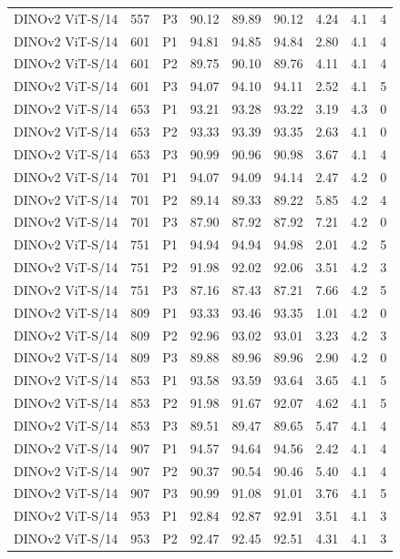 {\begin{longtable}{lrlrrrrrr}
DINOv2 ViT-S/14 & 557 & P3 & 90.12 & 89.89 & 90.12 & 4.24 & 4.1 & 4 \\
DINOv2 ViT-S/14 & 601 & P1 & 94.81 & 94.85 & 94.84 & 2.80 & 4.1 & 4 \\
DINOv2 ViT-S/14 & 601 & P2 & 89.75 & 90.10 & 89.76 & 4.11 & 4.1 & 4 \\
DINOv2 ViT-S/14 & 601 & P3 & 94.07 & 94.10 & 94.11 & 2.52 & 4.1 & 5 \\
DINOv2 ViT-S/14 & 653 & P1 & 93.21 & 93.28 & 93.22 & 3.19 & 4.3 & 0 \\
DINOv2 ViT-S/14 & 653 & P2 & 93.33 & 93.39 & 93.35 & 2.63 & 4.1 & 0 \\
DINOv2 ViT-S/14 & 653 & P3 & 90.99 & 90.96 & 90.98 & 3.67 & 4.1 & 4 \\
DINOv2 ViT-S/14 & 701 & P1 & 94.07 & 94.09 & 94.14 & 2.47 & 4.2 & 0 \\
DINOv2 ViT-S/14 & 701 & P2 & 89.14 & 89.33 & 89.22 & 5.85 & 4.2 & 4 \\
DINOv2 ViT-S/14 & 701 & P3 & 87.90 & 87.92 & 87.92 & 7.21 & 4.2 & 0 \\
DINOv2 ViT-S/14 & 751 & P1 & 94.94 & 94.94 & 94.98 & 2.01 & 4.2 & 5 \\
DINOv2 ViT-S/14 & 751 & P2 & 91.98 & 92.02 & 92.06 & 3.51 & 4.2 & 3 \\
DINOv2 ViT-S/14 & 751 & P3 & 87.16 & 87.43 & 87.21 & 7.66 & 4.2 & 5 \\
DINOv2 ViT-S/14 & 809 & P1 & 93.33 & 93.46 & 93.35 & 1.01 & 4.2 & 0 \\
DINOv2 ViT-S/14 & 809 & P2 & 92.96 & 93.02 & 93.01 & 3.23 & 4.2 & 3 \\
DINOv2 ViT-S/14 & 809 & P3 & 89.88 & 89.96 & 89.96 & 2.90 & 4.2 & 0 \\
DINOv2 ViT-S/14 & 853 & P1 & 93.58 & 93.59 & 93.64 & 3.65 & 4.1 & 5 \\
DINOv2 ViT-S/14 & 853 & P2 & 91.98 & 91.67 & 92.07 & 4.62 & 4.1 & 5 \\
DINOv2 ViT-S/14 & 853 & P3 & 89.51 & 89.47 & 89.65 & 5.47 & 4.1 & 4 \\
DINOv2 ViT-S/14 & 907 & P1 & 94.57 & 94.64 & 94.56 & 2.42 & 4.1 & 4 \\
DINOv2 ViT-S/14 & 907 & P2 & 90.37 & 90.54 & 90.46 & 5.40 & 4.1 & 4 \\
DINOv2 ViT-S/14 & 907 & P3 & 90.99 & 91.08 & 91.01 & 3.76 & 4.1 & 5 \\
DINOv2 ViT-S/14 & 953 & P1 & 92.84 & 92.87 & 92.91 & 3.51 & 4.1 & 3 \\
DINOv2 ViT-S/14 & 953 & P2 & 92.47 & 92.45 & 92.51 & 4.31 & 4.1 & 3 \\

\end{longtable}}
